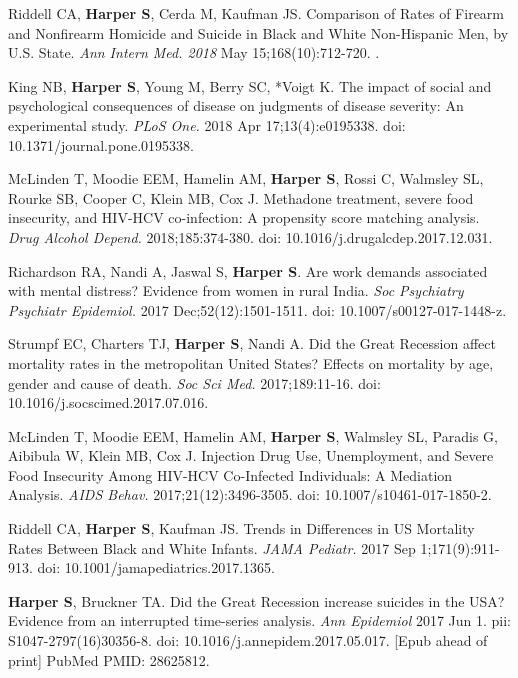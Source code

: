 \documentclass[
  letterpaper,
  DIV=11,
  numbers=noendperiod]{scrartcl}
\begin{document}
\begin{etaremune}
\item *Riddell CA, \textbf{Harper S}, Cerda M, Kaufman JS. Comparison of Rates of Firearm and Nonfirearm Homicide and Suicide in Black and White Non-Hispanic Men, by U.S.
State. \emph{Ann Intern Med. 2018} May 15;168(10):712-720. . 

\item King NB, \textbf{Harper S}, Young M, Berry SC, *Voigt K. The impact of social and psychological consequences of disease on judgments of disease severity: An
experimental study. \emph{PLoS One.} 2018 Apr 17;13(4):e0195338. doi: 10.1371/journal.pone.0195338.

\item McLinden T, Moodie EEM, Hamelin AM, \textbf{Harper S}, Rossi C, Walmsley SL, Rourke SB, Cooper C, Klein MB, Cox J. Methadone treatment, severe food insecurity, and
HIV-HCV co-infection: A propensity score matching analysis. \emph{Drug Alcohol Depend.} 2018;185:374-380. doi: 10.1016/j.drugalcdep.2017.12.031.

\item *Richardson RA, Nandi A, Jaswal S, \textbf{Harper S}. Are work demands associated with mental distress? Evidence from women in rural India. \emph{Soc Psychiatry Psychiatr
Epidemiol.} 2017 Dec;52(12):1501-1511. doi: 10.1007/s00127-017-1448-z.

\item Strumpf EC, Charters TJ, \textbf{Harper S}, Nandi A. Did the Great Recession affect mortality rates in the metropolitan United States? Effects on mortality by age, gender and cause of death. \emph{Soc Sci Med.} 2017;189:11-16. doi: 10.1016/j.socscimed.2017.07.016.

\item McLinden T, Moodie EEM, Hamelin AM, \textbf{Harper S}, Walmsley SL, Paradis G, Aibibula W, Klein MB, Cox J. Injection Drug Use, Unemployment, and Severe Food Insecurity Among HIV-HCV Co-Infected Individuals: A Mediation Analysis. \emph{AIDS Behav.} 2017;21(12):3496-3505. doi: 10.1007/s10461-017-1850-2.

\item *Riddell CA, \textbf{Harper S}, Kaufman JS. Trends in Differences in US Mortality Rates Between Black and White Infants. \emph{JAMA Pediatr.} 2017 Sep 1;171(9):911-913. doi: 10.1001/jamapediatrics.2017.1365.

\item \textbf{Harper S}, Bruckner TA. Did the Great Recession increase suicides in the USA? Evidence from an interrupted time-series analysis. \emph{Ann Epidemiol} 2017 Jun 1. pii: S1047-2797(16)30356-8. doi: 10.1016/j.annepidem.2017.05.017. [Epub ahead of print] PubMed PMID: 28625812.


\end{etaremune}
\end{document}
